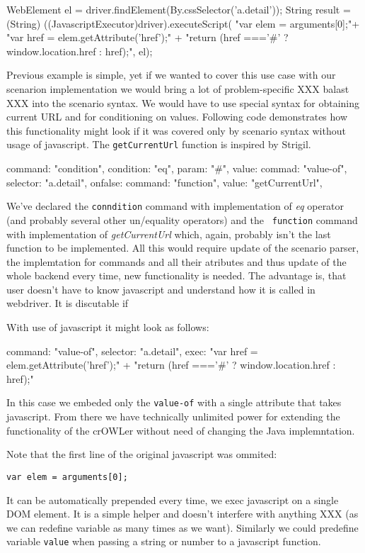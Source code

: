 \begtt
WebElement el = driver.findElement(By.cssSelector('a.detail'));
String result = (String) ((JavascriptExecutor)driver).executeScript(
"var elem = arguments[0];"+
"var href = elem.getAttribute('href');" +
"return (href ==='#' ? window.location.href : href);", el);
\endtt

Previous example is simple, yet if we wanted to cover this use case with our
scenarion implementation we would bring a lot of problem-specific XXX balast XXX
into the scenario syntax. We would have to use special syntax for obtaining
current URL and for conditioning on values. Following code demonstrates how this 
functionality might look if it was covered only by scenario syntax without usage
of javascript. The {\tt getCurrentUrl} function is inspired by Strigil. 

\begtt
{
  command: "condition", 
  condition: "eq", 
  param: "#", 
  value: {
    commad: "value-of", 
    selector: "a.detail", 
  }
  onfalse: {
    command: "function", 
    value: "getCurrentUrl", 
  }
}
\endtt

We've declared the {\tt conndition} command with implementation of {\em eq}
operator (and probably several other un/equality operators) and the {\tt
function} command with implementation of {\em getCurrentUrl} which, again,
probably isn't the last function to be implemented. All this would require
update of the scenario parser, the implemtation for commands and all their
atributes and thus update of the whole backend every time, new functionality is
needed. The advantage is, that user doesn't have to know javascript and
understand how it is called in webdriver. It is discutable if 

With use of javascript it might look as follows: 

\begtt
{
  command: "value-of", 
  selector: "a.detail", 
  exec: "var href = elem.getAttribute('href');" +
        "return (href ==='#' ? window.location.href : href);"
}
\endtt

In this case we embeded only the {\tt value-of} with a single attribute that
takes javascript. From there we have technically unlimited power for extending
the functionality of the crOWLer without need of changing the Java implemntation. 

Note that the first line of the original javascript was ommited: 

{\tt var elem = arguments[0];} 

It can be automatically prepended every time, we exec javascript on a single
DOM element. It is a simple helper and doesn't interfere with anything XXX (as
we can redefine variable as many times as we want). Similarly we could
predefine variable {\tt value} when passing a string or number to a javascript
function. 

